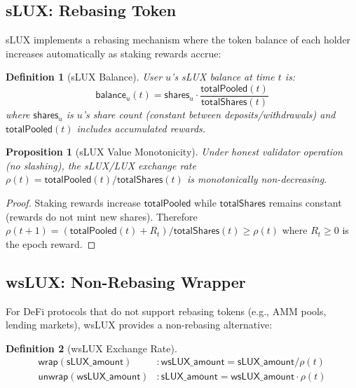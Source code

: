 \documentclass[11pt,a4paper]{article}
\newtheorem{proposition}[theorem]{Proposition}
\newtheorem{definition}{Definition}
\begin{document}
\subsection{sLUX: Rebasing Token}

sLUX implements a rebasing mechanism where the token balance of each holder increases automatically as staking rewards accrue:

\begin{definition}[sLUX Balance]
User $u$'s sLUX balance at time $t$ is:
\begin{equation}
    \mathsf{balance}_u(t) = \mathsf{shares}_u \cdot \frac{\mathsf{totalPooled}(t)}{\mathsf{totalShares}(t)}
\end{equation}
where $\mathsf{shares}_u$ is $u$'s share count (constant between deposits/withdrawals) and $\mathsf{totalPooled}(t)$ includes accumulated rewards.
\end{definition}

\begin{proposition}[sLUX Value Monotonicity]
Under honest validator operation (no slashing), the sLUX/LUX exchange rate $\rho(t) = \mathsf{totalPooled}(t) / \mathsf{totalShares}(t)$ is monotonically non-decreasing.
\end{proposition}

\begin{proof}
Staking rewards increase $\mathsf{totalPooled}$ while $\mathsf{totalShares}$ remains constant (rewards do not mint new shares). Therefore $\rho(t+1) = (\mathsf{totalPooled}(t) + R_t) / \mathsf{totalShares}(t) \geq \rho(t)$ where $R_t \geq 0$ is the epoch reward.
\end{proof}

\subsection{wsLUX: Non-Rebasing Wrapper}

For DeFi protocols that do not support rebasing tokens (e.g., AMM pools, lending markets), wsLUX provides a non-rebasing alternative:

\begin{definition}[wsLUX Exchange Rate]
\begin{align}
    \mathsf{wrap}(\mathsf{sLUX\_amount}) &: \mathsf{wsLUX\_amount} = \mathsf{sLUX\_amount} / \rho(t) \\
    \mathsf{unwrap}(\mathsf{wsLUX\_amount}) &: \mathsf{sLUX\_amount} = \mathsf{wsLUX\_amount} \cdot \rho(t)
\end{align}
\end{definition}
\end{document}

